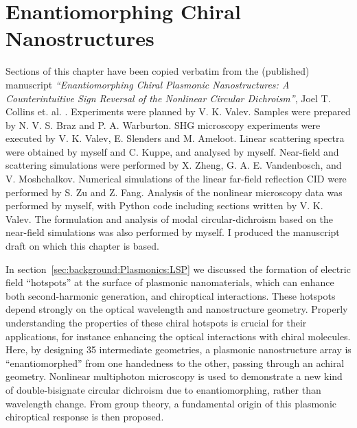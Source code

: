 \chapter{Enantiomorphing Chiral Nanostructures}\label{sec:results:EnantiomorphingChiralCrosses}


Sections of this chapter have been copied verbatim from the (published) manuscript \textit{``Enantiomorphing Chiral Plasmonic Nanostructures: A Counterintuitive Sign Reversal of the Nonlinear Circular Dichroism''}, Joel T. Collins et. al. \cite{Collins2018}. 
Experiments were planned by V. K. Valev. Samples were prepared by N. V. S. Braz and P. A. Warburton. SHG microscopy experiments were executed by V. K. Valev, E. Slenders and M. Ameloot. Linear scattering spectra were obtained by myself and C. Kuppe, and analysed by myself. Near-field and scattering simulations were performed by X. Zheng, G. A. E. Vandenbosch, and V. Moshchalkov. Numerical simulations of the linear far-field reflection CID were performed by S. Zu and Z. Fang. 
Analysis of the nonlinear microscopy data was performed by myself, with Python code including sections written by V. K. Valev. The formulation and analysis of modal circular-dichroism based on the near-field simulations was also performed by myself. I produced the manuscript draft on which this chapter is based.

\bigskip \noindent
In section~\ref{sec:background:Plasmonics:LSP} we discussed the formation of electric field ``hotspots'' at the surface of plasmonic nanomaterials, which can enhance both second-harmonic generation, and chiroptical interactions. These hotspots depend strongly on the optical wavelength and nanostructure geometry.
Properly understanding the properties of these chiral hotspots is crucial for their applications, for instance enhancing the optical interactions with chiral molecules. 
Here, by designing 35 intermediate geometries, a plasmonic nanostructure array is ``enantiomorphed'' from one handedness to the other, passing through an achiral geometry. 
Nonlinear multiphoton microscopy is used to demonstrate a new kind of double-bisignate circular dichroism due to enantiomorphing, rather than wavelength change.
From group theory, a fundamental origin of this plasmonic chiroptical response is then proposed. 

